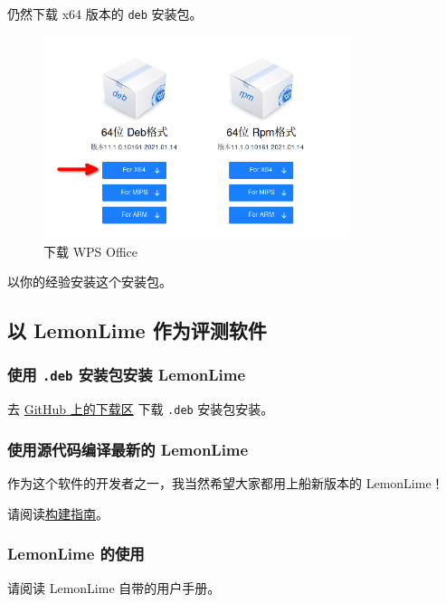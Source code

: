 \documentclass[UTF-8]{ctexart}
\begin{document}
				仍然下载 x64 版本的 \texttt{deb} 安装包。
				
				\begin{figure}[H]
					\centering
					\includegraphics[width=0.8\textwidth]{fig/wps_office_download.png}
					\caption*{下载 WPS Office}
				\end{figure}
				
				以你的经验安装这个安装包。
				
		\subsection{以 LemonLime 作为评测软件}
			
			\subsubsection{使用 \texttt{.deb} 安装包安装 LemonLime}
			
				去 \href{https://github.com/Project-LemonLime/Project_LemonLime/releases}{GitHub 上的下载区} 下载 \texttt{.deb} 安装包安装。
			
			\subsubsection{使用源代码编译最新的 LemonLime}
			
				作为这个软件的开发者之一，我当然希望大家都用上船新版本的 LemonLime！
			
				请阅读\href{https://github.com/Project-LemonLime/Project_LemonLime/blob/master/BUILD.md}{构建指南}。
				
			\subsubsection{LemonLime 的使用}
			
				请阅读 LemonLime 自带的用户手册。
				
\end{document}
